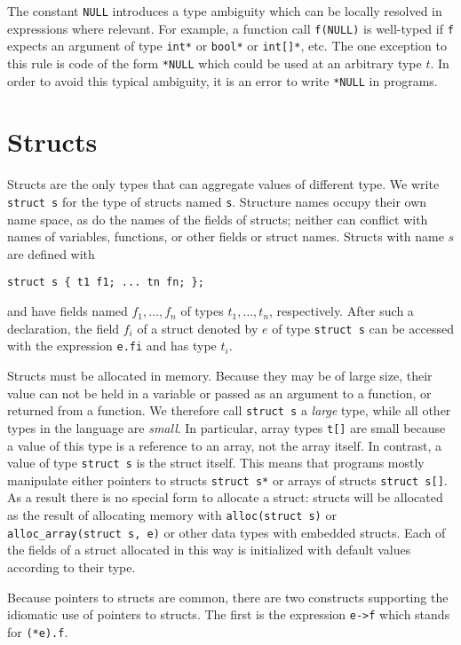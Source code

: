 \documentclass[11pt]{article}
\begin{document}
The constant \verb'NULL' introduces a type ambiguity which can
be locally resolved in expressions where relevant.  For example,
a function call \verb'f(NULL)' is well-typed if \verb'f'
expects an argument of type \verb'int*' or \verb'bool*' or
\verb'int[]*', etc.  The one exception to this rule is code of
the form \verb'*NULL' which could be used at an arbitrary type
$t$.  In order to avoid this typical ambiguity, it is an error
to write \verb'*NULL' in programs.

\section{Structs}

Structs are the only types that can aggregate values of different
type.  We write \verb'struct s' for the type of structs named
\verb's'.  Structure names occupy their own name space, as do
the names of the fields of structs; neither can conflict
with names of variables, functions, or other fields or struct
names.  Structs with name $s$ are defined with
\begin{verbatim}
struct s { t1 f1; ... tn fn; };
\end{verbatim}
and have fields named $f_1, \ldots, f_n$ of types $t_1, \ldots, t_n$,
respectively.  After such a declaration, the field $f_i$ of a struct
denoted by $e$ of type \verb'struct s' can be accessed with the
expression \verb'e.fi' and has type $t_i$.

Structs must be allocated in memory.  Because they may be of large
size, their value can not be held in a variable or passed as an
argument to a function, or returned from a function.  We therefore
call \verb'struct s' a \emph{large} type, while all other types
in the language are \emph{small}.  In particular, array types
\verb't[]' are small because a value of this type is a reference
to an array, not the array itself.  In contrast, a value of type
\verb'struct s' is the struct itself.  This means that programs
mostly manipulate either pointers to structs \verb'struct s*'
or arrays of structs \verb'struct s[]'.  As a result there is
no special form to allocate a struct: structs will be allocated
as the result of allocating memory with \verb'alloc(struct s)' or
\verb'alloc_array(struct s, e)' or other data types with embedded
structs.  Each of the fields of a struct allocated in this way
is initialized with default values according to their type.

Because pointers to structs are common, there are two constructs
supporting the idiomatic use of pointers to structs.  The first
is the expression \verb'e->f' which stands for \verb'(*e).f'.
\end{document}
